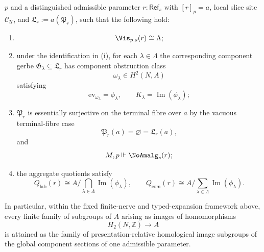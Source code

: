 \begin{theorem}
\(p\) and a distinguished admissible parameter \(r:\mathsf{Ref}_s\) with
\([r]_p=a\), local slice site \(\mathcal C_{\mathcal U}\), and
\(\mathfrak L_r:=a(\mathfrak P_r)\), such that the following hold:
\begin{enumerate}[label=(\roman*),nosep]
\item
\[
\Vis_{p,s}(r)\cong \Lambda;
\]
\item under the identification in \textup{(i)}, for each $\lambda\in\Lambda$ the corresponding component gerbe $\mathfrak G_\lambda\subseteq \mathfrak L_r$ has component obstruction class
\[
\omega_\lambda\in H^2(N,A)
\]
satisfying
\[
\mathrm{ev}_{\omega_\lambda}=\phi_\lambda,
\qquad
K_\lambda=\operatorname{Im}(\phi_\lambda);
\]
\item $\mathfrak P_r$ is essentially surjective on the terminal fibre over $a$ by the vacuous terminal-fibre case
\[
\mathfrak P_r(a)=\varnothing=\mathfrak L_r(a),
\]
and
\[
M,p\Vdash \NoAmalg_s(r);
\]
\item the aggregate quotients satisfy
\[
Q_{\mathrm{lab}}(r)\cong A\Big/\bigcap_{\lambda\in\Lambda}\operatorname{Im}(\phi_\lambda),
\qquad
Q_{\mathrm{com}}(r)\cong A\Big/\sum_{\lambda\in\Lambda}\operatorname{Im}(\phi_\lambda).
\]
\end{enumerate}
In particular, within the fixed finite-nerve and typed-expansion
framework above, every finite family of subgroups of $A$ arising as images of homomorphisms
\[
H_2(N,\mathbb Z)\to A
\]
is attained as the family of presentation-relative homological image subgroups of the global component sections of one admissible parameter.
\end{theorem}

